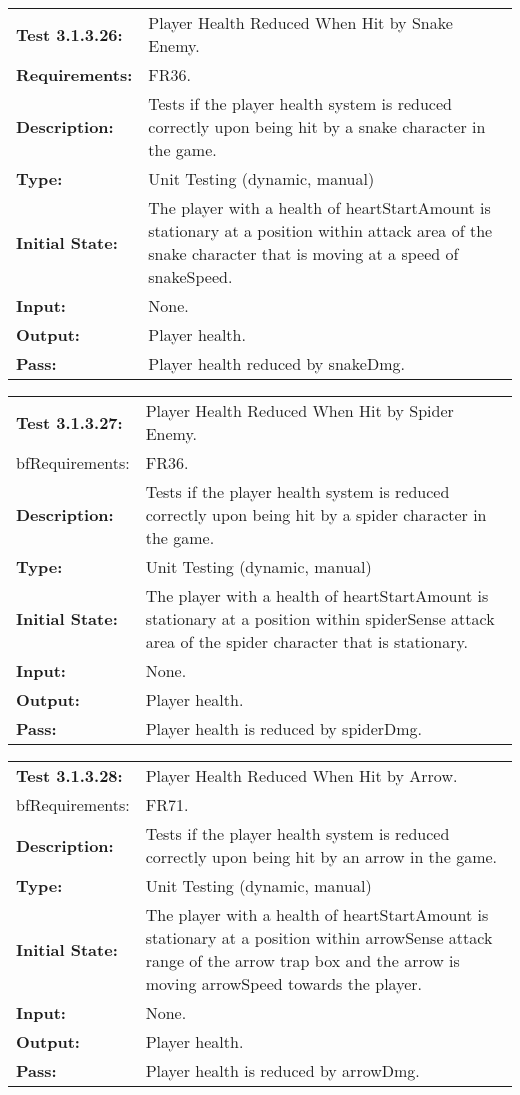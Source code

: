 \documentclass[12pt, titlepage]{article}
\begin{document}
\begin{tabular}{|l|p{10cm}|}
    \hline
    \bf{Test} 3.1.3.26: & Player Health Reduced When Hit by Snake Enemy.\\
    \bf{Requirements}: & FR36. \\
    \bf{Description}: & Tests if the player health system is reduced correctly upon being hit by a snake character in the game. \\
    \bf{Type}: & Unit Testing (dynamic, manual) \\
    \bf{Initial State}: & The player with a health of heartStartAmount is stationary at a position within attack area of the snake character that is moving at a speed of snakeSpeed.\\
    \bf{Input}: & None.\\
    \bf{Output}: & Player health.\\
    \bf{Pass}: & Player health reduced by snakeDmg.\\
    \hline
\end{tabular}

\begin{tabular}{|l|p{10cm}|}
    \hline
    \bf{Test} 3.1.3.27: & Player Health Reduced When Hit by Spider Enemy. \\
    bf{Requirements}: & FR36. \\
    \bf{Description}: & Tests if the player health system is reduced correctly upon being hit by a spider character in the game. \\
    \bf{Type}: & Unit Testing (dynamic, manual) \\
    \bf{Initial State}: & The player with a health of heartStartAmount is stationary at a position within spiderSense attack area of the spider character that is stationary. \\
    \bf{Input}: & None.\\
    \bf{Output}: & Player health.\\
    \bf{Pass}: & Player health is reduced by spiderDmg. \\
    \hline
\end{tabular}

\begin{tabular}{|l|p{10cm}|}
    \hline
    \bf{Test} 3.1.3.28: & Player Health Reduced When Hit by Arrow.\\
    bf{Requirements}: & FR71. \\
    \bf{Description}: & Tests if the player health system is reduced correctly upon being hit by an arrow in the game. \\
    \bf{Type}: & Unit Testing (dynamic, manual) \\
    \bf{Initial State}: & The player with a health of heartStartAmount is stationary at a position within arrowSense attack range of the arrow trap box and the arrow is moving arrowSpeed towards the player.\\
    \bf{Input}: & None.\\
    \bf{Output}: & Player health.\\
    \bf{Pass}: & Player health is reduced by arrowDmg. \\
    \hline
\end{tabular}
\end{document}
